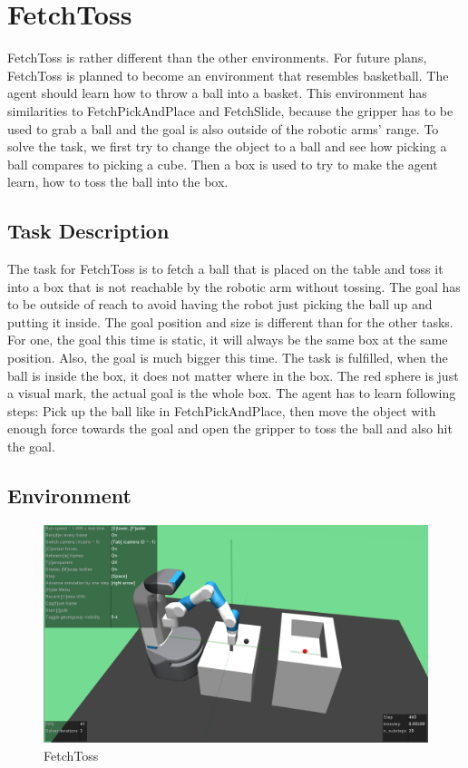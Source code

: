 \section{FetchToss}

FetchToss is rather different than the other environments. For future plans, FetchToss is planned to become an environment that resembles basketball. The agent should learn how to throw a ball into a basket. This environment has similarities to FetchPickAndPlace and FetchSlide, because the gripper has to be used to grab a ball and the goal is also outside of the robotic arms' range. To solve the task, we first try to change the object to a ball and see how picking a ball compares to picking a cube.
Then a box is used to try to make the agent learn, how to toss the ball into the box.

\subsection{Task Description}

The task for FetchToss is to fetch a ball that is placed on the table and toss it into a box that is not reachable by the robotic arm without tossing. The goal has to be outside of reach to avoid having the robot just picking the ball up and putting it inside. The goal position and size is different than for the other tasks. For one, the goal this time is static, it will always be the same box at the same position. Also, the goal is much bigger this time. The task is fulfilled, when the ball is inside the box, it does not matter where in the box. The red sphere is just a visual mark, the actual goal is the whole box. The agent has to learn following steps: Pick up the ball like in FetchPickAndPlace, then move the object with enough force towards the goal and open the gripper to toss the ball and also hit the goal.


\subsection{Environment}

\begin{figure} [ht]
	
	\centering
	\includegraphics[width=1\textwidth]{figures/FetchToss-v1.png}
	\caption{FetchToss}
	\label{toss1}
\end{figure}

